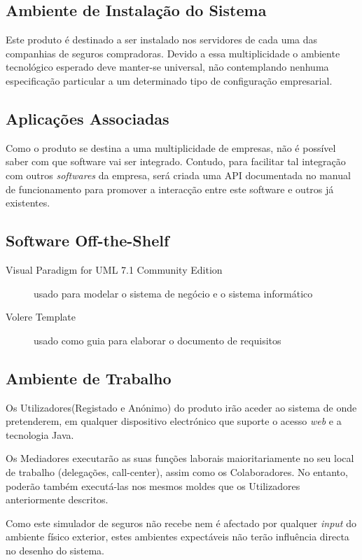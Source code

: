 \subsection{Ambiente de Instalação do Sistema}


Este produto é destinado a ser instalado nos servidores de cada uma das companhias de seguros compradoras. Devido a essa multiplicidade o ambiente tecnológico esperado deve manter-se universal, não contemplando nenhuma especificação particular a um determinado tipo de configuração empresarial.

\subsection{Aplicações Associadas}
Como o produto se destina a uma multiplicidade de empresas, não é possível saber com que software vai ser integrado. Contudo, para facilitar tal integração com outros \emph{softwares} da empresa, será criada uma API documentada no manual de funcionamento para promover a interacção entre este software e outros já existentes.

\subsection{Software Off-the-Shelf}
\begin{description}
    \item [Visual Paradigm for UML 7.1 Community Edition] usado para modelar o sistema de negócio e o sistema informático
    \item [Volere Template] usado como guia para elaborar o documento de requisitos

\end{description}

\subsection{Ambiente de Trabalho}
Os Utilizadores(Registado e Anónimo) do produto irão aceder ao sistema de onde pretenderem, em qualquer dispositivo electrónico que suporte o acesso \emph{web} e a tecnologia Java.

Os Mediadores executarão as suas funções laborais maioritariamente no seu local de trabalho (delegações, call-center), assim como os Colaboradores. No entanto, poderão também executá-las nos mesmos moldes que os Utilizadores anteriormente descritos.

Como este simulador de seguros não recebe nem é afectado por qualquer \emph{input} do ambiente físico exterior, estes ambientes expectáveis não terão influência directa no desenho do sistema.

